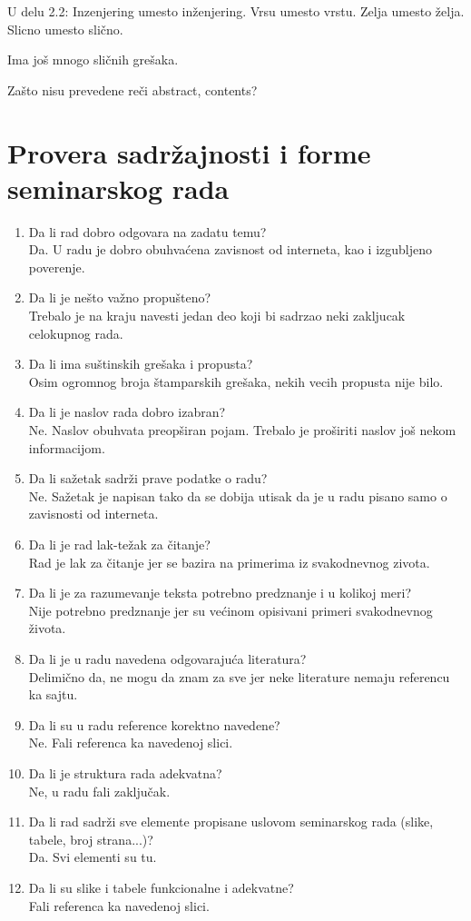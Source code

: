 \documentclass[a4paper]{report}
\begin{document}
U delu 2.2:
Inzenjering umesto inženjering.
Vrsu umesto vrstu.
Zelja umesto želja.
Slicno umesto slično.

Ima još mnogo sličnih grešaka.

Zašto nisu prevedene reči abstract, contents?
\section{Provera sadržajnosti i forme seminarskog rada}

\begin{enumerate}
\item Da li rad dobro odgovara na zadatu temu?\\
Da. U radu je dobro obuhvaćena zavisnost od interneta, kao i izgubljeno poverenje.
\item Da li je nešto važno propušteno?\\
Trebalo je na kraju navesti jedan deo koji bi sadrzao neki zakljucak celokupnog rada.
\item Da li ima suštinskih grešaka i propusta?\\
Osim ogromnog broja štamparskih grešaka, nekih vecih propusta nije bilo.
\item Da li je naslov rada dobro izabran?\\
Ne. Naslov obuhvata preopširan pojam. Trebalo je proširiti naslov još nekom informacijom. 
\item Da li sažetak sadrži prave podatke o radu?\\
Ne. Sažetak je napisan tako da se dobija utisak da je u radu pisano samo o zavisnosti od interneta.
\item Da li je rad lak-težak za čitanje?\\
Rad je lak za čitanje jer se bazira na primerima iz svakodnevnog zivota.
\item Da li je za razumevanje teksta potrebno predznanje i u kolikoj meri?\\
Nije potrebno predznanje jer su većinom opisivani primeri svakodnevnog života.
\item Da li je u radu navedena odgovarajuća literatura?\\
Delimično da, ne mogu da znam za sve jer neke literature nemaju referencu ka sajtu.
\item Da li su u radu reference korektno navedene?\\
Ne. Fali referenca ka navedenoj slici.
\item Da li je struktura rada adekvatna?\\
Ne, u radu fali zaključak.
\item Da li rad sadrži sve elemente propisane uslovom seminarskog rada (slike, tabele, broj strana...)?\\
Da. Svi elementi su tu.
\item Da li su slike i tabele funkcionalne i adekvatne?\\
Fali referenca ka navedenoj slici.
\end{enumerate}
\end{document}
